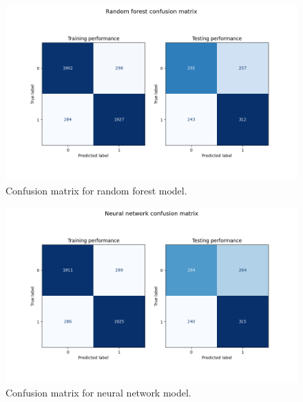 \documentclass[12pt]{article}
\begin{document}
\begin{figure}[h!]
\centering
\begin{center} \includegraphics[width=6in]{"../output/rf_confusion_matrix.png"} \end{center}
\caption{Confusion matrix for random forest model.}
\label{fig:rf-cm}
\end{figure}

\newpage 

\begin{figure}[h!]
\centering
\begin{center} \includegraphics[width=6in]{"../output/nn_confusion_matrix.png"} \end{center}
\caption{Confusion matrix for neural network model.}
\label{fig:nn-cm}
\end{figure}
\end{document}
